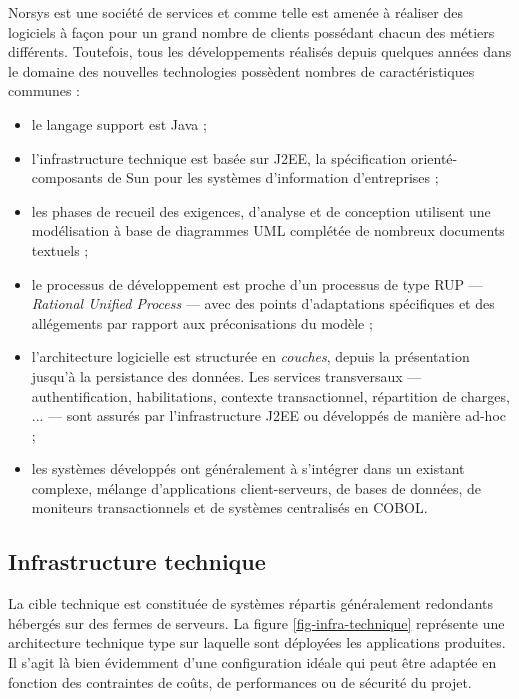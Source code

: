 \textsf{Norsys} est une soci\'et\'e de services et comme telle est
amen\'ee \`a r\'ealiser des logiciels \`a fa\c{c}on pour un grand
nombre de clients poss\'edant chacun des m\'etiers
diff\'erents. Toutefois, tous les d\'eveloppements r\'ealis\'es
depuis quelques ann\'ees dans le domaine des \og nouvelles
technologies\fg{} poss\`edent nombres de caract\'eristiques communes :
\begin{itemize}
  \item le langage support est \textsf{Java} ;
  \item l'infrastructure technique est bas\'ee sur \textsf{J2EE}\cite{j2eespec}, la
    sp\'ecification orient\'e-composants de \textsf{Sun} pour les
    syst\`emes d'information d'entreprises ;
  \item les phases de recueil des exigences, d'analyse et de conception
    utilisent une mod\'elisation \`a base de diagrammes \textsf{UML}
    compl\'et\'ee de nombreux documents textuels ;
  \item le processus de d\'eveloppement est proche d'un processus de
    type \textsf{RUP} --- \emph{Rational Unified Process} --- avec des points
    d'adaptations sp\'ecifiques et des all\'egements par rapport aux
    pr\'econisations du mod\`ele ;
  \item l'architecture logicielle est structur\'ee en \emph{couches},
    depuis la pr\'esentation jusqu'\`a la persistance des
    donn\'ees. Les services transversaux --- authentification,
    habilitations, contexte transactionnel, r\'epartition de charges,
    ... --- sont assur\'es par l'infrastructure \textsf{J2EE} ou
    d\'evelopp\'es de mani\`ere ad-hoc ;
  \item les syst\`emes d\'evelopp\'es ont g\'en\'eralement \`a
    s'int\'egrer dans un existant complexe, m\'elange d'applications
    client-serveurs, de bases de donn\'ees, de
    moniteurs transactionnels et de syst\`emes centralis\'es en
    \textsf{COBOL}.
\end{itemize}

\subsection{Infrastructure technique}
\label{sec:infr-techn}
La cible technique est constitu\'ee de syst\`emes r\'epartis
g\'en\'eralement redondants h\'eberg\'es sur des fermes de
serveurs. La figure \ref{fig-infra-technique} repr\'esente une
architecture technique type sur laquelle sont d\'eploy\'ees les
applications produites. Il s'agit l\`a bien \'evidemment d'une configuration id\'eale qui
peut \^etre adapt\'ee en fonction des contraintes de co\^uts, de
performances ou de s\'ecurit\'e du projet. 


